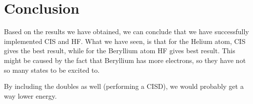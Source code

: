 \section{Conclusion} \label{sec:conclusion}
Based on the results we have obtained, we can conclude that we have successfully implemented CIS and HF. What we have seen, is that for the Helium atom, CIS gives the best result, while for the Beryllium atom HF gives best result. This might be caused by the fact that Beryllium has more electrons, so they have not so many states to be excited to. 

By including the doubles as well (performing a CISD), we would probably get a way lower energy. 